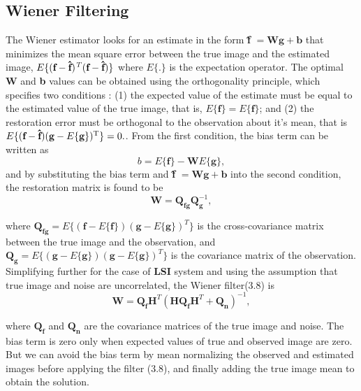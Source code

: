 \documentclass[a4paper]{book}
\begin{document}
\subsection{Wiener Filtering}
The Wiener estimator looks for an estimate in the form \textbf{\^{f}} $ = \textbf{Wg} + \textbf{b} $ that minimizes the mean square error between the true image and the estimated image, $E\{(\textbf{f}-\textbf{\^{f}})\textsuperscript{\textit{T}}(\textbf{f}-\textbf{\^{f}})\}$ where $ E\{.\} $ is the expectation operator. The optimal \textbf{W} and \textbf{b} values can be obtained using the orthogonality principle, which specifies two conditions : (1) the expected value of the estimate must be equal to the estimated value of the true image, that is, $ E\{\textbf{\^{f}}\} = E\{\textbf{f}\} $; and (2) the restoration error must be orthogonal to the observation about it's mean, that is $ E\{(\textbf{f}-\textbf{\^{f}})(\textbf{g}-E\{\textbf{g}\})\textsuperscript{T}\} = 0.$. From the first condition, the bias term can be written as 
\begin{equation}
\label{eq3.7}
b = E\{\textbf{f}\} - \textbf{W}E\{\textbf{g}\},
\end{equation}
and by substituting the bias term and \textbf{\^{f}} $ = \textbf{Wg} + \textbf{b} $ into the second condition, the restoration matrix is found to be 
\begin{equation}
\label{eq3.8}
\textbf{W} = \textbf{Q}_{\textbf{fg}}\textbf{Q}_{\textbf{g}}^{-1},
\end{equation}

where $ \textbf{Q}_{\textbf{fg}} = E\{(\textbf{f} - E\{\textbf{f}\})(\textbf{g}-E\{\textbf{g}\})^{T} \} $ is the cross-covariance matrix between the true image and the observation, and $ \textbf{Q}_{\textbf{g}} = E\{(\textbf{g} - E\{\textbf{g}\})(\textbf{g}-E\{\textbf{g}\})^{T} \} $ is the covariance matrix of the observation. Simplifying further for the case of \textbf{LSI} system and using the assumption that true image and noise are uncorrelated, the Wiener filter(3.8) is 
\begin{equation}
\label{eq3.9}
\textbf{W} = \textbf{Q}_{\textbf{f}}\textbf{H}^{T}(\textbf{H}\textbf{Q}_{\textbf{f}}\textbf{H}^{T} + \textbf{Q}_{\textbf{n}})^{-1},
\end{equation}

where $ \textbf{Q}_{\textbf{f}} $ and $ \textbf{Q}_{\textbf{n}} $ are the covariance matrices of the true image and noise. The bias term is zero only when expected values of true and observed image are zero. But we can avoid the bias term by mean normalizing the observed and estimated images before applying the filter (3.8), and finally adding the true image mean to obtain the solution.
\end{document}
